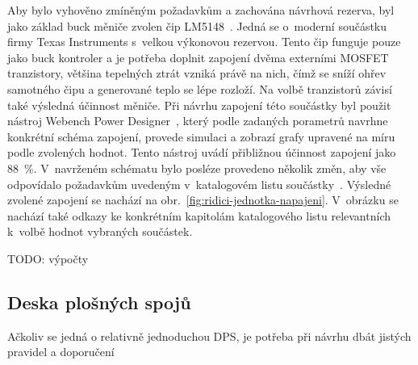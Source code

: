         Aby bylo vyhověno zmíněným požadavkům a zachována návrhová rezerva, byl jako základ buck měniče zvolen čip LM5148~\cite{lm5148-datasheet}. Jedná se o~moderní součástku firmy Texas Instruments s~velkou výkonovou rezervou. Tento čip funguje pouze jako buck kontroler a je potřeba doplnit zapojení dvěma externími MOSFET tranzistory, většina tepelných ztrát vzniká právě na nich, čímž se sníží ohřev samotného čipu a generované teplo se lépe rozloží. Na volbě tranzistorů závisí také výsledná účinnost měniče. Při návrhu zapojení této součástky byl použit nástroj Webench Power Designer~\cite{webench-power-designer}, který podle zadaných porametrů navrhne konkrétní schéma zapojení, provede simulaci a zobrazí grafy upravené na míru podle zvolených hodnot. Tento nástroj uvádí přibližnou účinnost zapojení jako \qty{88}{\percent}. V~navrženém schématu bylo posléze provedeno několik změn, aby vše odpovídalo požadavkům uvedeným v~katalogovém listu součástky~\cite{lm5148-datasheet}. Výsledné zvolené zapojení se nachází na obr.~\ref{fig:ridici-jednotka-napajeni}. V~obrázku se nachází také odkazy ke konkrétním kapitolám katalogového listu relevantních k~volbě hodnot vybraných součástek. 

        TODO: výpočty 

    \subsection{Deska plošných spojů}
        Ačkoliv se jedná o relativně jednoduchou DPS, je potřeba při návrhu dbát jistých pravidel a doporučení 

   

